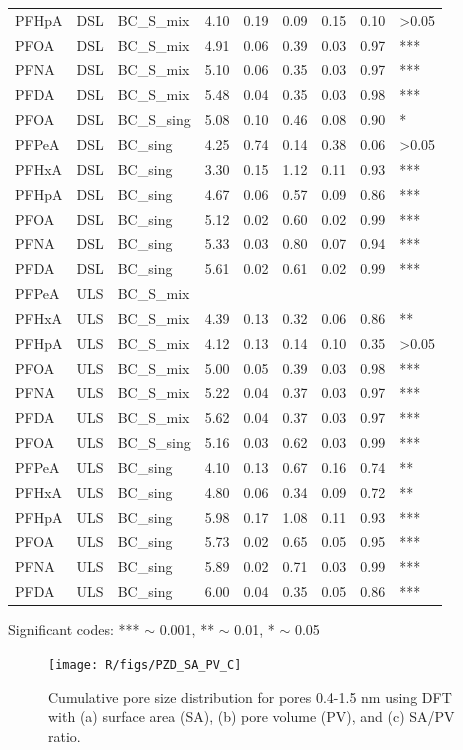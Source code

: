 \begin{table}
{\begin{threeparttable}
\begin{tabular}{lllllllll}
PFHpA & DSL & BC\_S\_mix & 4.10 & 0.19 & 0.09 & 0.15 & 0.10 & \textgreater{}0.05 \\
PFOA & DSL & BC\_S\_mix & 4.91 & 0.06 & 0.39 & 0.03 & 0.97 & *** \\
PFNA & DSL & BC\_S\_mix & 5.10 & 0.06 & 0.35 & 0.03 & 0.97 & *** \\
PFDA & DSL & BC\_S\_mix & 5.48 & 0.04 & 0.35 & 0.03 & 0.98 & *** \\
PFOA & DSL & BC\_S\_sing & 5.08 & 0.10 & 0.46 & 0.08 & 0.90 & * \\
PFPeA & DSL & BC\_sing & 4.25 & 0.74 & 0.14 & 0.38 & 0.06 & \textgreater{}0.05 \\
PFHxA & DSL & BC\_sing & 3.30 & 0.15 & 1.12 & 0.11 & 0.93 & *** \\
PFHpA & DSL & BC\_sing & 4.67 & 0.06 & 0.57 & 0.09 & 0.86 & *** \\
PFOA & DSL & BC\_sing & 5.12 & 0.02 & 0.60 & 0.02 & 0.99 & *** \\
PFNA & DSL & BC\_sing & 5.33 & 0.03 & 0.80 & 0.07 & 0.94 & *** \\
PFDA & DSL & BC\_sing & 5.61 & 0.02 & 0.61 & 0.02 & 0.99 & *** \\
\addlinespace 
PFPeA & ULS & BC\_S\_mix &  &  &  &  &  &  \\
PFHxA & ULS & BC\_S\_mix & 4.39 & 0.13 & 0.32 & 0.06 & 0.86 & ** \\
PFHpA & ULS & BC\_S\_mix & 4.12 & 0.13 & 0.14 & 0.10 & 0.35 & \textgreater{}0.05 \\
PFOA & ULS & BC\_S\_mix & 5.00 & 0.05 & 0.39 & 0.03 & 0.98 & *** \\
PFNA & ULS & BC\_S\_mix & 5.22 & 0.04 & 0.37 & 0.03 & 0.97 & *** \\
PFDA & ULS & BC\_S\_mix & 5.62 & 0.04 & 0.37 & 0.03 & 0.97 & *** \\
PFOA & ULS & BC\_S\_sing & 5.16 & 0.03 & 0.62 & 0.03 & 0.99 & *** \\
PFPeA & ULS & BC\_sing & 4.10 & 0.13 & 0.67 & 0.16 & 0.74 & ** \\
PFHxA & ULS & BC\_sing & 4.80 & 0.06 & 0.34 & 0.09 & 0.72 & ** \\
PFHpA & ULS & BC\_sing & 5.98 & 0.17 & 1.08 & 0.11 & 0.93 & *** \\
PFOA & ULS & BC\_sing & 5.73 & 0.02 & 0.65 & 0.05 & 0.95 & *** \\
PFNA & ULS & BC\_sing & 5.89 & 0.02 & 0.71 & 0.03 & 0.99 & *** \\
PFDA & ULS & BC\_sing & 6.00 & 0.04 & 0.35 & 0.05 & 0.86 & *** \\ \bottomrule
\end{tabular}
\begin{tablenotes}
\item Significant codes: *** $\sim$ 0.001, ** $\sim$ 0.01, * $\sim$ 0.05
\end{tablenotes}
\end{threeparttable}}
\end{table}

\begin{figure}[htb]
    \centering
    \texttt{[image: R/figs/PZD\_SA\_PV\_C]}
    \caption{Cumulative pore size distribution for pores 0.4-1.5 nm using DFT with (a) surface area (SA), (b) pore volume (PV), and (c) SA/PV ratio.}
    \label{appfig:PZD_small}
\end{figure}

